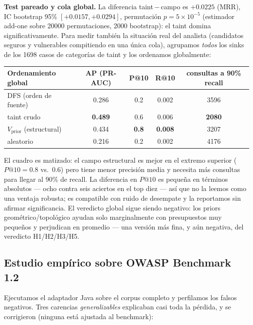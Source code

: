 \documentclass[11pt]{article}
\begin{document}
\noindent\textbf{Test pareado y cola global.} La diferencia taint\,$-$\,campo es
$+0.0225$ (MRR), IC bootstrap 95\% $[+0.0157,+0.0294]$, permutación $p=5\times10^{-5}$ (estimador add-one sobre 20000 permutaciones, 2000 bootstrap):
el taint domina significativamente. Para medir también la situación real del
analista (candidatos seguros y vulnerables compitiendo en una única cola),
agrupamos \emph{todos} los sinks de los 1698 casos de categorías de taint y los
ordenamos globalmente:

\begin{center}
\small
\begin{tabular}{lcccc}
\toprule
Ordenamiento global & AP (PR-AUC) & P@10 & R@10 & consultas a 90\% recall \\
\midrule
DFS (orden de fuente) & 0.286 & 0.2 & 0.002 & 3596 \\
taint crudo & \textbf{0.489} & 0.6 & 0.006 & \textbf{2080} \\
$V_{\text{prior}}$ (estructural) & 0.434 & \textbf{0.8} & \textbf{0.008} & 3207 \\
aleatorio & 0.216 & 0.2 & 0.002 & 4176 \\
\bottomrule
\end{tabular}
\end{center}

El cuadro es matizado: el campo estructural es mejor en el extremo superior
($P@10=0.8$ vs.\ $0.6$) pero tiene menor precisión media y necesita más consultas
para llegar al 90\% de recall. La diferencia en $P@10$ es pequeña en términos
absolutos --- ocho contra seis aciertos en el top diez --- así que no la leemos
como una ventaja robusta; es compatible con ruido de desempate y la reportamos sin
afirmar significancia. El veredicto global sigue siendo negativo: los priors
geométrico/topológico ayudan
solo marginalmente con presupuestos muy pequeños y perjudican en promedio --- una
versión más fina, y aún negativa, del veredicto H1/H2/H3/H5.



\subsection{Estudio empírico sobre OWASP Benchmark 1.2}
Ejecutamos el adaptador Java sobre el corpus completo y perfilamos los falsos
negativos. Tres carencias \emph{generalizables} explicaban casi toda la pérdida,
y se corrigieron (ninguna está ajustada al benchmark):
\end{document}
